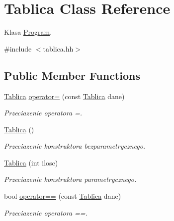 \hypertarget{class_tablica}{\section{Tablica Class Reference}
\label{class_tablica}
}


Klasa \hyperlink{class_program}{Program}.  




{\ttfamily \#include $<$tablica.\-hh$>$}

\subsection*{Public Member Functions}
\begin{DoxyCompactItemize}
\item 
\hyperlink{class_tablica}{Tablica} \hyperlink{class_tablica_a2d776cbdc02ed70b045b2c680bfdb695}{operator=} (const \hyperlink{class_tablica}{Tablica} dane)
\begin{DoxyCompactList}\small\item\em Przeciazenie operatora =. \end{DoxyCompactList}\item 
\hypertarget{class_tablica_a5f484e7b0478e1ff9b62e894f9d7b28d}{\hyperlink{class_tablica_a5f484e7b0478e1ff9b62e894f9d7b28d}{Tablica} ()}\label{class_tablica_a5f484e7b0478e1ff9b62e894f9d7b28d}

\begin{DoxyCompactList}\small\item\em Przeciazenie konstruktora bezparametrycznego. \end{DoxyCompactList}\item 
\hypertarget{class_tablica_aee4b66a81059b6ef1881909cd9f344b4}{\hyperlink{class_tablica_aee4b66a81059b6ef1881909cd9f344b4}{Tablica} (int ilosc)}\label{class_tablica_aee4b66a81059b6ef1881909cd9f344b4}

\begin{DoxyCompactList}\small\item\em Przeciazenie konstruktora parametrycznego. \end{DoxyCompactList}\item 
bool \hyperlink{class_tablica_a3864d3f5d0a339a496136e3546e71759}{operator==} (const \hyperlink{class_tablica}{Tablica} dane)
\begin{DoxyCompactList}\small\item\em Przeciazenie operatora ==. \end{DoxyCompactList}\end{DoxyCompactItemize}
